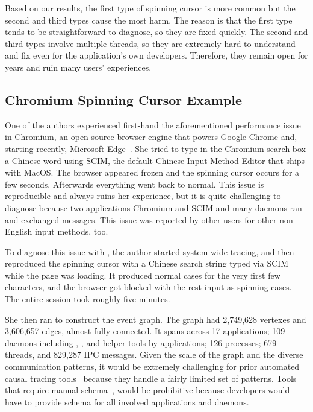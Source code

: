 Based on our results, the first type of spinning cursor is more common but the
second and third types cause the most harm.  The reason is that the first type
tends to be straightforward to diagnose, so they are fixed quickly.  The second
and third types involve multiple threads, so they are extremely hard to
understand and fix even for the application's own developers.  Therefore, they
remain open for years and ruin many users' experiences.

\subsection{Chromium Spinning Cursor Example}


One of the authors experienced first-hand the aforementioned performance issue
in Chromium, an open-source browser engine that powers Google Chrome and,
starting recently, Microsoft Edge~\cite{chromiumurl}.  She tried to type in the
Chromium search box a Chinese word using SCIM, the default Chinese Input Method
Editor that ships with MacOS.  The browser appeared frozen and the spinning
cursor occurs for a few seconds.  Afterwards everything went back to normal.
This issue is reproducible and always ruins her experience, but it is quite
challenging to diagnose because two applications Chromium and SCIM and many
daemons ran and exchanged messages.  This issue was reported by other users for
other non-English input methods, too.

To diagnose this issue with \xxx, the author started system-wide tracing, and
then reproduced the spinning cursor with a Chinese search string typed via SCIM
while the page was loading. It produced normal cases for the very first few
characters, and the browser got blocked with the rest input as spinning cases.
The entire session took roughly five minutes.

She then ran \xxx to construct the event graph.  The graph had 2,749,628
vertexes and 3,606,657 edges, almost fully connected.  It spans across 17
applications; 109 daemons including , , 
and helper tools by applications; 126 processes; 679 threads, and 829,287 IPC
messages.  Given the scale of the graph and the diverse communication patterns,
it would be extremely challenging for prior automated causal tracing
tools~\cite{aguilera2003performance, zhang2013panappticon, attariyan2012x,
cohen2004correlating} because they handle a fairly limited set of patterns.
Tools that require manual schema~\cite{barham2004using, reynolds2006pip}, would
be prohibitive because developers would have to provide schema for all involved
applications and daemons.

